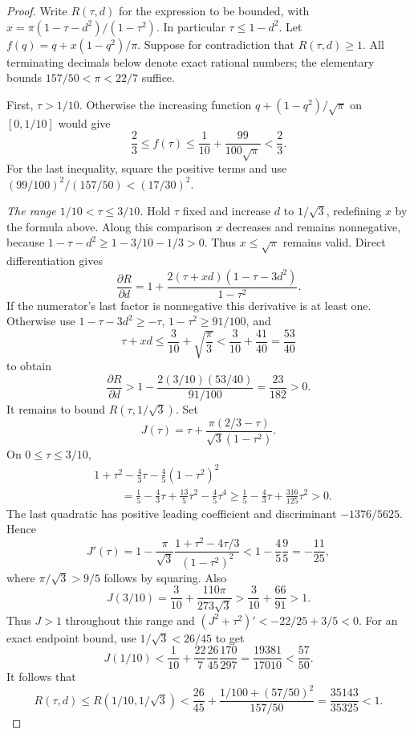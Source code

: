 \begin{proof}
Write $R(\tau,d)$ for the expression to be bounded, with
$x=\pi(1-\tau-d^2)/(1-\tau^2)$. In particular
$\tau\le1-d^2$. Let $f(q)=q+x(1-q^2)/\pi$.
Suppose for contradiction that $R(\tau,d)\ge1$.
All terminating decimals below denote exact rational numbers; the
elementary bounds $157/50<\pi<22/7$ suffice.

First, $\tau>1/10$.  Otherwise the increasing function
$q+(1-q^2)/\sqrt\pi$ on $[0,1/10]$ would give
\[
 \frac23\le f(\tau)
 \le\frac1{10}+\frac{99}{100\sqrt\pi}<\frac23.
\]
For the last inequality, square the positive terms and use
$(99/100)^2/(157/50)<(17/30)^2$.

\smallskip
\noindent\emph{The range $1/10<\tau\le3/10$.}
Hold $\tau$ fixed and increase $d$ to $1/\sqrt3$, redefining $x$ by
the formula above.  Along this comparison $x$ decreases and
remains nonnegative, because
$1-\tau-d^2\ge1-3/10-1/3>0$.  Thus $x\le\sqrt\pi$ remains valid.
Direct differentiation gives
\[
 \frac{\partial R}{\partial d}
 =1+\frac{2(\tau+xd)(1-\tau-3d^2)}{1-\tau^2}.
\]
If the numerator's last factor is nonnegative this derivative is at
least one.  Otherwise use $1-\tau-3d^2\ge-\tau$,
$1-\tau^2\ge91/100$, and
\[
 \tau+xd\le\frac3{10}+\sqrt{\frac\pi3}
 <\frac3{10}+\frac{41}{40}=\frac{53}{40}
\]
to obtain
\[
 \frac{\partial R}{\partial d}
 >1-\frac{2(3/10)(53/40)}{91/100}
 =\frac{23}{182}>0.
\]
It remains to bound $R(\tau,1/\sqrt3)$.  Set
\[
 J(\tau)=\tau+
 \frac{\pi(2/3-\tau)}{\sqrt3(1-\tau^2)}.
\]
On $0\le\tau\le3/10$,
\begin{align*}
 &1+\tau^2-\frac43\tau-\frac45(1-\tau^2)^2\\
 &\hspace{1cm}=
 \frac15-\frac43\tau+\frac{13}{5}\tau^2-\frac45\tau^4
 \ge\frac15-\frac43\tau+\frac{316}{125}\tau^2>0.
\end{align*}
The last quadratic has positive leading coefficient and discriminant
$-1376/5625$.  Hence
\[
 J'(\tau)
 =1-\frac\pi{\sqrt3}
     \frac{1+\tau^2-4\tau/3}{(1-\tau^2)^2}
 <1-\frac45\frac95=-\frac{11}{25},
\]
where $\pi/\sqrt3>9/5$ follows by squaring.  Also
\[
 J(3/10)=\frac3{10}+\frac{110\pi}{273\sqrt3}
 >\frac3{10}+\frac{66}{91}>1.
\]
Thus $J>1$ throughout this range and
$(J^2+\tau^2)'<-22/25+3/5<0$.
For an exact endpoint bound, use $1/\sqrt3<26/45$ to get
\[
 J(1/10)
 <\frac1{10}+\frac{22}{7}\frac{26}{45}\frac{170}{297}
 =\frac{19381}{17010}<\frac{57}{50}.
\]
It follows that
\[
 R(\tau,d)
 \le R(1/10,1/\sqrt3)
 <\frac{26}{45}
   +\frac{1/100+(57/50)^2}{157/50}
 =\frac{35143}{35325}<1.
\]


\end{proof}
